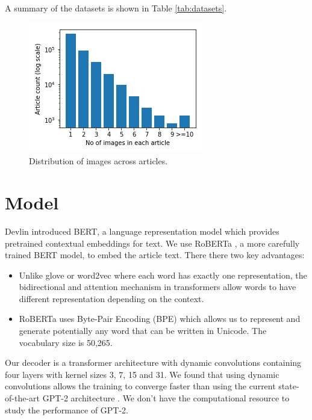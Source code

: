 \documentclass[10pt,twocolumn,letterpaper]{article}
\begin{document}
A summary of the datasets is shown in Table \ref{tab:datasets}.


\begin{figure}[t]
   \begin{center}
   \includegraphics[width=0.8\linewidth]{figures/caption_dist.png}
   \end{center}
      \caption{Distribution of images across articles.}
   \label{fig:dist}
   \end{figure}

\section{Model}

Devlin \etal \cite{Devlin2019BERT} introduced BERT, a language representation
model which provides pretrained contextual embeddings for text. We use
RoBERTa \cite{Liu2019RoBERTaAR}, a more carefully trained BERT model, to
embed the article text. There there two key advantages:

\begin{itemize}
   \item Unlike glove \cite{Pennington2014Glove} or word2vec
   \cite{Mikolov2013DistributedRO} where each word has exactly one
   representation, the bidirectional and attention mechanism in transformers
   allow words to have different representation depending on the context.
   \item RoBERTa uses Byte-Pair Encoding (BPE)
   \cite{Sennrich2015NeuralMT,Radford2019LanguageMA} which allows us to
   represent and generate potentially any word that can be written in
   Unicode. The vocabulary size is 50,265.
\end{itemize}

Our decoder is a transformer architecture with dynamic convolutions
\cite{Wu2018PayLA} containing four layers with kernel sizes 3, 7, 15 and 31. We
found that using dynamic convolutions allows the training to converge faster
than using the current state-of-the-art GPT-2 architecture
\cite{Radford2019LanguageMA}. We don't have the computational resource to study
the performance of GPT-2.
\end{document}
